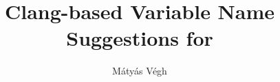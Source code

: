 \documentclass[a4paper,12pt]{report}
\title{Clang-based Variable Name Suggestions for \CC{}}
\author{Mátyás Végh}
\begin{document}


\tableofcontents






{}

\end{document}
